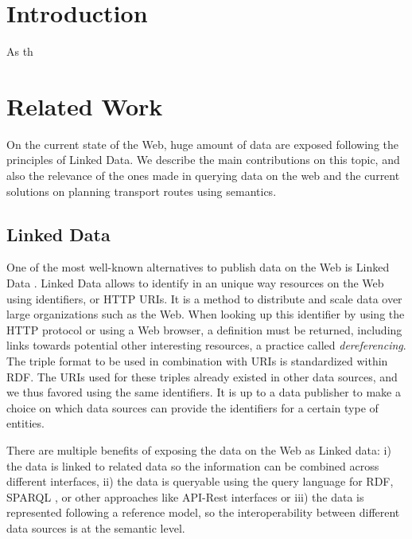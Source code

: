 \documentclass[sw]{iosart2x}
\begin{document}


\section{Introduction}\label{introduction} %
As th



\section{Related Work}\label{related_work} %
On the current state of the Web, huge amount of data are exposed following the principles of Linked Data. We describe the main contributions on this topic, and also the relevance of the ones made in querying data on the web and the current solutions on planning transport routes using semantics.
\subsection{Linked Data}
One of the most well-known alternatives to publish data on the Web is Linked Data \cite{bizer2009linked}. Linked Data allows to identify in an unique way resources on the Web using identifiers, or HTTP URIs. It is a method to distribute and scale data over large organizations such as the Web. When looking up this identifier by using the HTTP protocol or using a Web browser, a definition must be returned, including links towards potential other interesting resources, a practice called \textit{dereferencing}. The triple format to be used in combination with URIs is standardized within RDF. The URIs used for these triples already existed in other data sources, and we thus favored using the same identifiers. It is up to a data publisher to make a choice on which data sources can provide the identifiers for a certain type of entities. 

There are multiple benefits of exposing the data on the Web as Linked data: i) the data is linked to related data so the information can be combined across different interfaces, ii) the data is queryable using the query language for RDF, SPARQL \cite{prud2006sparql}, or other approaches like API-Rest interfaces \cite{world2014json} or \cite{lanthaler2013creating} iii) the data is represented following a reference model, so the interoperability between different data sources is at the semantic level.
\end{document}
